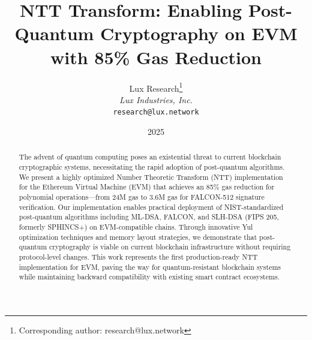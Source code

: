 \documentclass[11pt,a4paper]{article}
\title{NTT Transform: Enabling Post-Quantum Cryptography on EVM\\with 85\% Gas Reduction}
\author{
Lux Research\thanks{Corresponding author: research@lux.network}\\
\textit{Lux Industries, Inc.}\\
\texttt{research@lux.network}
}
\date{2025}
\begin{document}
\luxcoverpage

\begin{abstract}
The advent of quantum computing poses an existential threat to current blockchain cryptographic systems, necessitating the rapid adoption of post-quantum algorithms. We present a highly optimized Number Theoretic Transform (NTT) implementation for the Ethereum Virtual Machine (EVM) that achieves an 85\% gas reduction for polynomial operations---from 24M gas to 3.6M gas for FALCON-512 signature verification. Our implementation enables practical deployment of NIST-standardized post-quantum algorithms including ML-DSA, FALCON, and SLH-DSA (FIPS 205, formerly SPHINCS+) on EVM-compatible chains. Through innovative Yul optimization techniques and memory layout strategies, we demonstrate that post-quantum cryptography is viable on current blockchain infrastructure without requiring protocol-level changes. This work represents the first production-ready NTT implementation for EVM, paving the way for quantum-resistant blockchain systems while maintaining backward compatibility with existing smart contract ecosystems.
\end{abstract}















\end{document}
